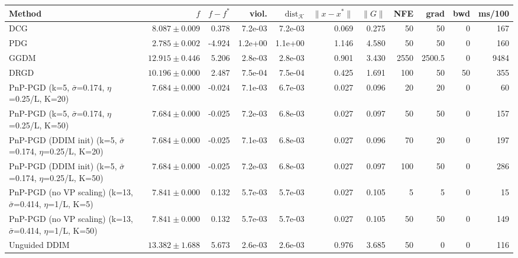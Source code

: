 \begin{tabular}{lrrrrrrrrrr}
\toprule
Method & $f$ & $f-f^*$ & viol. & $\mathrm{dist}_\mathcal{K}$ & $\|x-x^*\|$ & $\|G\|$ & NFE & grad & bwd & ms/100 \\
\midrule
DCG & $8.087\pm0.009$ & 0.378 & 7.2e-03 & 7.2e-03 & 0.069 & 0.275 & 50 & 50 & 0 & 167 \\
PDG & $2.785\pm0.002$ & -4.924 & 1.2e+00 & 1.1e+00 & 1.146 & 4.580 & 50 & 50 & 0 & 160 \\
GGDM & $12.915\pm0.446$ & 5.206 & 2.8e-03 & 2.8e-03 & 0.901 & 3.430 & 2550 & 2500.5 & 0 & 9484 \\
DRGD & $10.196\pm0.000$ & 2.487 & 7.5e-04 & 7.5e-04 & 0.425 & 1.691 & 100 & 50 & 50 & 355 \\
PnP-PGD (k=5, $\bar\sigma$=0.174, $\eta$=0.25/L, K=20) & $7.684\pm0.000$ & -0.024 & 7.1e-03 & 6.7e-03 & 0.027 & 0.096 & 20 & 20 & 0 & 60 \\
PnP-PGD (k=5, $\bar\sigma$=0.174, $\eta$=0.25/L, K=50) & $7.684\pm0.000$ & -0.025 & 7.2e-03 & 6.8e-03 & 0.027 & 0.097 & 50 & 50 & 0 & 157 \\
PnP-PGD (DDIM init) (k=5, $\bar\sigma$=0.174, $\eta$=0.25/L, K=20) & $7.684\pm0.000$ & -0.025 & 7.1e-03 & 6.8e-03 & 0.027 & 0.096 & 70 & 20 & 0 & 197 \\
PnP-PGD (DDIM init) (k=5, $\bar\sigma$=0.174, $\eta$=0.25/L, K=50) & $7.684\pm0.000$ & -0.025 & 7.2e-03 & 6.8e-03 & 0.027 & 0.097 & 100 & 50 & 0 & 286 \\
PnP-PGD (no VP scaling) (k=13, $\bar\sigma$=0.414, $\eta$=1/L, K=5) & $7.841\pm0.000$ & 0.132 & 5.7e-03 & 5.7e-03 & 0.027 & 0.105 & 5 & 5 & 0 & 15 \\
PnP-PGD (no VP scaling) (k=13, $\bar\sigma$=0.414, $\eta$=1/L, K=50) & $7.841\pm0.000$ & 0.132 & 5.7e-03 & 5.7e-03 & 0.027 & 0.105 & 50 & 50 & 0 & 149 \\
Unguided DDIM & $13.382\pm1.688$ & 5.673 & 2.6e-03 & 2.6e-03 & 0.976 & 3.685 & 50 & 0 & 0 & 116 \\
\bottomrule
\end{tabular}

